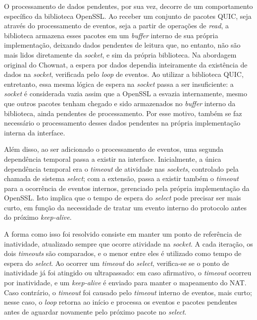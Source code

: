 O processamento de dados pendentes, por sua vez, decorre de um comportamento específico da biblioteca OpenSSL. Ao receber um conjunto de pacotes QUIC, seja através do processamento de eventos, seja a partir de operações de \textit{read}, a biblioteca armazena esses pacotes em um \textit{buffer} interno de sua própria implementação, deixando dados pendentes de leitura que, no entanto, não são mais lidos diretamente da \textit{socket}, e sim da própria biblioteca. Na abordagem original do Chownat, a espera por dados dependia inteiramente da existência de dados na \textit{socket}, verificada pelo \textit{loop} de eventos. Ao utilizar a biblioteca QUIC, entretanto, essa mesma lógica de espera na \textit{socket} passa a ser insuficiente: a \textit{socket} é considerada vazia assim que a OpenSSL a esvazia internamente, mesmo que outros pacotes tenham chegado e sido armazenados no \textit{buffer} interno da biblioteca, ainda pendentes de processamento. Por esse motivo, também se faz necessário o processamento desses dados pendentes na própria implementação interna da interface.

Além disso, ao ser adicionado o processamento de eventos, uma segunda dependência temporal passa a existir na interface. Inicialmente, a única dependência temporal era o \textit{timeout} de atividade nas \textit{sockets}, controlado pela chamada de sistema \textit{select}; com a extensão, passa a existir também o \textit{timeout} para a ocorrência de eventos internos, gerenciado pela própria implementação da OpenSSL. Isto implica que o tempo de espera do \textit{select} pode precisar ser mais curto, em função da necessidade de tratar um evento interno do protocolo antes do próximo \textit{keep-alive}.

A forma como isso foi resolvido consiste em manter um ponto de referência de inatividade, atualizado sempre que ocorre atividade na \textit{socket}. A cada iteração, os dois \textit{timeouts} são comparados, e o menor entre eles é utilizado como tempo de espera do \textit{select}. Ao ocorrer um \textit{timeout} do \textit{select}, verifica-se se o ponto de inatividade já foi atingido ou ultrapassado: em caso afirmativo, o \textit{timeout} ocorreu por inatividade, e um \textit{keep-alive} é enviado para manter o mapeamento do NAT. Caso contrário, o \textit{timeout} foi causado pelo \textit{timeout} interno de eventos, mais curto; nesse caso, o \textit{loop} retorna ao início e processa os eventos e pacotes pendentes antes de aguardar novamente pelo próximo pacote no \textit{select}.

